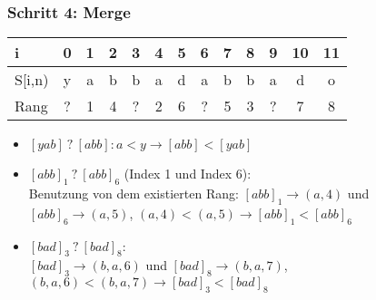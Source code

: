 \documentclass{beamer}
\begin{document}
\begin{frame}
\frametitle{Schritt 4: Merge}
\begin{table}
\begin{tabular}{l|c c c c c c c c c c c c}
    \toprule
    i      & 0 & 1 & 2 & 3 & 4 & 5 & 6 & 7 & 8 & 9 & 10 & 11 \\
    \midrule
    S[i,n) & y & a & b & b & a & d & a & b & b & a & d  & o  \\
    \midrule
    Rang   & ? & 1 & 4 & ? & 2 & 6 & ? & 5 & 3 & ? & 7  & 8 \\
    \bottomrule
\end{tabular}
\end{table}
\vspace{2mm}
\begin{itemize}
    \item $[yab]\:?\:[abb]: a < y \rightarrow [abb] < [yab]$
    \item $[abb]_1\:?\:[abb]_6$ (Index 1 und Index 6): \\ Benutzung von dem existierten Rang: $[abb]_1 \rightarrow (a,4)$ und $[abb]_6 \rightarrow (a,5)$, $(a,4) < (a,5) \rightarrow [abb]_1 < [abb]_6$
    \item $[bad]_3\:?\:[bad]_8$: \\ $[bad]_3 \rightarrow (b,a,6)$ und $[bad]_8 \rightarrow (b,a,7)$, $(b,a,6) < (b,a,7) \rightarrow [bad]_3 < [bad]_8$
\end{itemize}
\end{frame}
\end{document}
